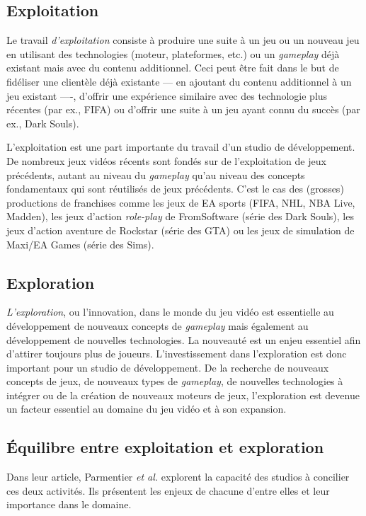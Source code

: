 \subsection{Exploitation}
Le travail \emph{d'exploitation} consiste à produire une suite à un jeu ou un nouveau jeu en utilisant des technologies (moteur, plateformes, etc.) ou un \emph{gameplay} déjà existant mais avec du contenu additionnel.
Ceci peut être fait dans le but de fidéliser une clientèle déjà existante --- en ajoutant du contenu additionnel à un jeu existant ----, d'offrir une expérience similaire avec des technologie plus récentes (par ex., FIFA) ou d'offrir une suite à un jeu ayant connu du succès (par ex., Dark Souls).

L'exploitation est une part importante du travail d'un studio de développement.
De nombreux jeux vidéos récents sont fondés sur de l'exploitation de jeux précédents, autant au niveau du \emph{gameplay} qu'au niveau des concepts fondamentaux qui sont r\'eutilis\'es de jeux précédents.
C'est le cas des (grosses) productions de franchises comme les jeux de EA sports (FIFA, NHL, NBA Live, Madden), les jeux d'action \emph{role-play} de FromSoftware (série des Dark Souls), les jeux d'action aventure de Rockstar (série des GTA) ou les jeux de simulation de Maxi/EA Games (série des Sims). 

\subsection{Exploration}
\emph{L'exploration}, ou l'innovation, dans le monde du jeu vidéo est essentielle au développement de nouveaux concepts de \emph{gameplay} mais également au développement de nouvelles technologies.
La nouveauté est un enjeu essentiel afin d'attirer toujours plus de joueurs.
L'investissement dans l'exploration est donc important pour un studio de développement.
De la recherche de nouveaux concepts de jeux, de nouveaux types de \emph{gameplay}, de nouvelles technologies à intégrer ou de la création de nouveaux moteurs de jeux, l'exploration est devenue un facteur essentiel au domaine du jeu vidéo et à son expansion.


\subsection{Équilibre entre exploitation et exploration}
Dans leur article, Parmentier \emph{et al.} \cite{ParmentierGuy2009Iecd} explorent la capacité des studios à concilier ces deux activités.
Ils présentent les enjeux de chacune d'entre elles et leur importance dans le domaine.

